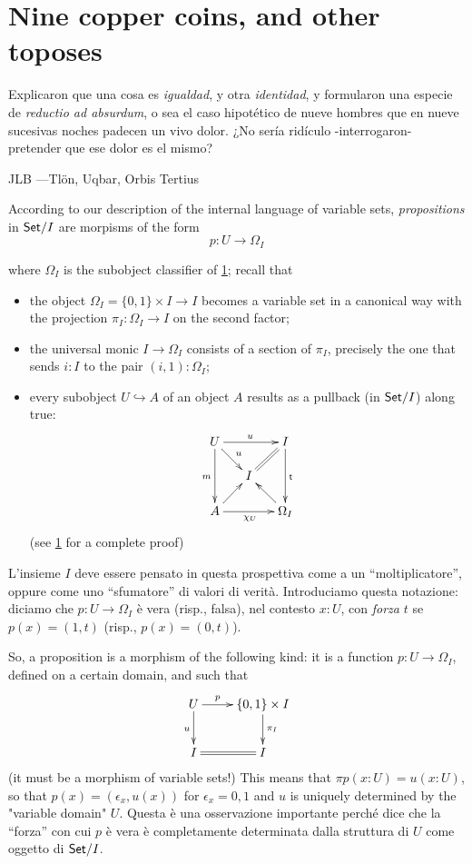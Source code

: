 \section{Nine copper coins, and other toposes}
\epigraph{Explicaron que una cosa es \emph{igualdad}, y otra \emph{identidad}, y formularon una especie de \emph{reductio ad absurdum}, o sea el caso hipotético de nueve hombres que en nueve sucesivas noches padecen un vivo dolor. ¿No sería ridículo -interrogaron- pretender que ese dolor es el mismo?}{JLB ---Tl\"on, Uqbar, Orbis Tertius}
According to our description of the internal language of variable sets, \emph{propositions} in $\mathsf{Set}/I$ are morpisms of the form
\[p : U \to \Omega_I\]

where $\Omega_I$ is the subobject classifier of \ref{}; recall that
\begin{itemize}
  \item the object $\Omega_I = \{0,1\}\times I \to I$ becomes a variable set in a canonical way with the projection $\pi_I : \Omega_I \to I$ on the second factor;
  \item the universal monic $I \to \Omega_I$ consists of a section of $\pi_I$, precisely the one that sends $i : I$ to the pair $(i,1) : \Omega_I$;
  \item every subobject $U \hookrightarrow A$ of an object $A$ results as a pullback (in $\mathsf{Set}/I$) along true:
        \[\xymatrix@R=5mm@C=5mm{
          U\ar[dr]^u\ar[rr]^u\ar[dd]_m&& I\ar[dd]^{\sf t} \ar@{=}[dl]\\
          &I& \\
          A \ar[ur]\ar[rr]_{\chi_U}&& \ar[ul]\Omega_I
        }\]
        (see \ref{} for a complete proof)
\end{itemize}
L'insieme $I$ deve essere pensato in questa prospettiva come a un ``moltiplicatore'', oppure come uno ``sfumatore'' di valori di verità. Introduciamo questa notazione: diciamo che $p : U \to \Omega_I$ è vera (risp., falsa), nel contesto $x :U$, con \emph{forza} $t$ se $p(x) =(1,t)$ (risp., $p(x)=(0,t)$).

So, a proposition is a morphism of the following kind: it is a function $p : U \to \Omega_I$, defined on a certain domain, and such that
\[
\xymatrix{
  U\ar[d]_u\ar[r]^-p  & \{0,1\}\times I \ar[d]^{\pi_I}\\ 
  I \ar@{=}[r]& I
}  
\]
(it must be a morphism of variable sets!) This means that $\pi p(x : U) = u(x : U)$, so that $p(x) = (\epsilon_x, u(x))$ for $\epsilon_x =0,1$ and $u$ is uniquely determined by the "variable domain" $U$. Questa è una osservazione importante perché dice che la ``forza'' con cui $p$ è vera è completamente determinata dalla struttura di $U$ come oggetto di $\mathsf{Set}/I$.


